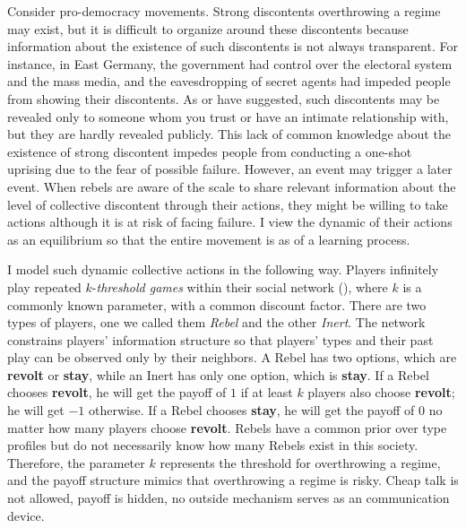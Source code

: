 \documentclass[12pt,letter]{article}
\theoremstyle{definition}
\theoremstyle{remark}
\theoremstyle{claim}
\begin{document}
Consider pro-democracy movements. Strong discontents overthrowing a regime may exist, but it is difficult to organize around these discontents because information about the existence of such discontents is not always transparent. For instance, in East Germany, the government had control over the electoral system and the mass media, and the eavesdropping of secret agents had impeded people from showing their discontents. As \citep{Karl-Dieter1993} or \citep{Chwe2000} have suggested, such discontents may be revealed only to someone whom you trust or have an intimate relationship with, but they are hardly revealed publicly. This lack of common knowledge about the existence of strong discontent impedes people from conducting a one-shot uprising due to the fear of possible failure. However, an event may trigger a later event. When rebels are aware of the scale to share relevant information about the level of collective discontent through their actions, they might be willing to take actions although it is at risk of facing failure. I view the dynamic of their actions as an equilibrium so that the entire movement is as of a learning process. 

I model such dynamic collective actions in the following way. Players infinitely play repeated $k$-\textit{threshold games} within their social network (\citep{Chwe2000}), where $k$ is a commonly known parameter, with a common discount factor. There are two types of players, one we called them \textit{Rebel} and the other \textit{Inert}.  The network constrains players' information structure so that players' types and their past play can be observed only by their neighbors. A Rebel has two options, which are \textbf{revolt} or \textbf{stay}, while an Inert has only one option, which is \textbf{stay}. If a Rebel chooses \textbf{revolt}, he will get the payoff of $1$ if at least $k$ players also choose \textbf{revolt}; he will get $-1$ otherwise. If a Rebel chooses \textbf{stay}, he will get the payoff of $0$ no matter how many players choose \textbf{revolt}. Rebels have a common prior over type profiles but do not necessarily know how many Rebels exist in this society. Therefore, the parameter $k$ represents the threshold for overthrowing a regime, and the payoff structure mimics that overthrowing a regime is risky. Cheap talk is not allowed, payoff is hidden, no outside mechanism serves as an communication device. 
\end{document}
